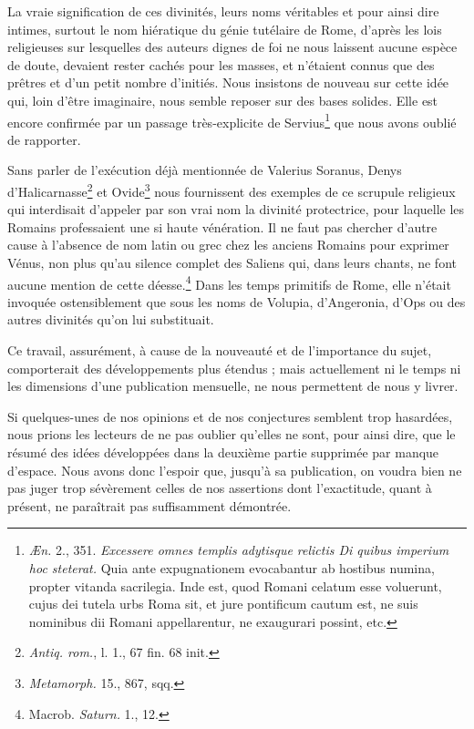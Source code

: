 \documentclass[a4paper, 11pt, oneside, polutonikogreek, french]{article}
\begin{document}
La vraie signification de ces divinités, leurs noms véritables et pour ainsi dire intimes, surtout le nom hiératique du génie tutélaire de Rome, d'après les lois religieuses sur lesquelles des auteurs dignes de foi ne nous laissent aucune espèce de doute, devaient rester cachés pour les masses, et n'étaient connus que des prêtres et d'un petit nombre d'initiés. Nous insistons de nouveau sur cette idée qui, loin d'être imaginaire, nous semble reposer sur des bases solides. Elle est encore confirmée par un passage très-explicite de Servius\footnote{\emph{Æn.} 2., 351. \emph{Excessere omnes templis adytisque relictis Di quibus imperium hoc steterat.} Quia ante expugnationem evocabantur ab hostibus numina, propter vitanda sacrilegia. Inde est, quod Romani celatum esse voluerunt, cujus dei tutela urbs Roma sit, et jure pontificum cautum est, ne suis nominibus dii Romani appellarentur, ne exaugurari possint, etc.} que nous avons oublié de rapporter.

Sans parler de l'exécution déjà mentionnée de Valerius Soranus, Denys d'Halicarnasse\footnote{\emph{Antiq. rom.}, l. 1., 67 fin. 68 init.} et Ovide\footnote{\emph{Metamorph.} 15., 867, sqq.} nous fournissent des exemples de ce scrupule religieux qui interdisait d'appeler par son vrai nom la divinité protectrice, pour laquelle les Romains professaient une si haute vénération. Il ne faut pas chercher d'autre cause à l'absence de nom latin ou grec chez les anciens Romains pour exprimer Vénus, non plus qu'au silence complet des Saliens qui, dans leurs chants, ne font aucune mention de cette déesse.\footnote{Macrob. \emph{Saturn.} 1., 12.} Dans les temps primitifs de Rome, elle n'était invoquée ostensiblement que sous les noms de Volupia, d'Angeronia, d'Ops ou des autres divinités qu'on lui substituait.

Ce travail, assurément, à cause de la nouveauté et de l'importance du sujet, comporterait des développements plus étendus ; mais actuellement ni le temps ni les dimensions d'une publication mensuelle, ne nous permettent de nous y livrer.

Si quelques-unes de nos opinions et de nos conjectures semblent trop hasardées, nous prions les lecteurs de ne pas oublier qu'elles ne sont, pour ainsi dire, que le résumé des idées développées dans la deuxième partie supprimée par manque d'espace. Nous avons donc l'espoir que, jusqu'à sa publication, on voudra bien ne pas juger trop sévèrement celles de nos assertions dont l'exactitude, quant à présent, ne paraîtrait pas suffisamment démontrée.
\clearpage
\end{document}
